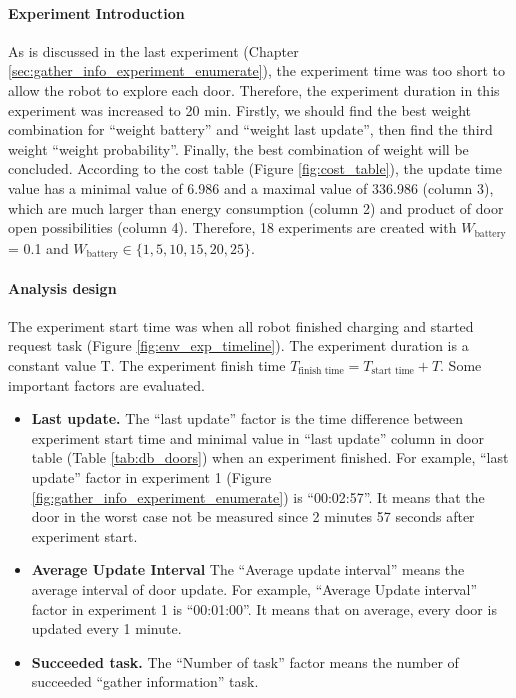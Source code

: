 \paragraph{Experiment Introduction} 
As is discussed in the last experiment (Chapter \ref{sec:gather_info_experiment_enumerate}), the experiment time was too short to allow the robot to explore each door. Therefore, the experiment duration in this experiment was increased to 20 min.
Firstly, we should find the best weight combination for ``weight battery'' and ``weight last update'', then find the third weight ``weight probability''. Finally, the best combination of weight will be concluded.
 According to the cost table (Figure \ref{fig:cost_table}), the update time value has a minimal value of 6.986 and a maximal value of 336.986 (column 3), which are much larger than energy consumption (column 2) and product of door open possibilities (column 4).
 Therefore, 18 experiments are created with $W_{\mbox{battery}}$
 = 0.1 and $W_{\mbox{battery}} \in \{1,5,10,15,20,25 \}$.

\paragraph{Analysis design} The experiment start time was when all robot finished charging and started request task (Figure \ref{fig:env_exp_timeline}). The experiment duration is a constant value T. The experiment finish time $T_{\mbox{finish time}} = T_{\mbox{start time}} + T $. Some important factors are evaluated. 
\begin{itemize}
 \item \textbf{Last update.} The ``last update'' factor is the time difference between experiment start time and minimal value in ``last update'' column in door table (Table \ref{tab:db_doors}) when an experiment finished. For example, ``last update'' factor in experiment 1 (Figure \ref{fig:gather_info_experiment_enumerate}) is ``00:02:57''. It means that the door in the worst case not be measured since 2 minutes 57 seconds after experiment start.
 \item \textbf{Average Update Interval} The ``Average update interval'' means the average interval of door update. For example, ``Average Update interval'' factor in experiment 1 is ``00:01:00''. It means that on average, every door is updated every 1 minute.
 \item \textbf{Succeeded task.} The ``Number of task'' factor means the number of succeeded ``gather information'' task.
\end{itemize}

